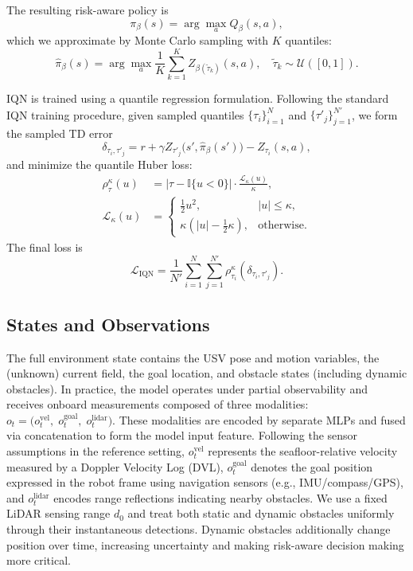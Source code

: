 \documentclass[runningheads]{llncs}
\begin{document}
The resulting risk-aware policy is
\begin{equation}
\pi_{\beta}(s)=\arg\max_{a} Q_{\beta}(s,a),
\label{eq:risk_policy}
\end{equation}
which we approximate by Monte Carlo sampling with $K$ quantiles:
\begin{equation}
\hat{\pi}_{\beta}(s)=
\arg\max_{a}\frac{1}{K}\sum_{k=1}^{K} Z_{\beta(\tilde{\tau}_k)}(s,a),
\quad
\tilde{\tau}_k \sim \mathcal{U}([0,1]).
\label{eq:risk_policy_mc}
\end{equation}

IQN is trained using a quantile regression formulation. Following the standard IQN training procedure, given sampled quantiles $\{\tau_i\}_{i=1}^{N}$ and $\{\tau'_j\}_{j=1}^{N'}$, we form the sampled TD error
\begin{equation}
\delta_{\tau_i,\tau'_j}
=
r + \gamma Z_{\tau'_j}\!\big(s', \hat{\pi}_{\beta}(s')\big)
- Z_{\tau_i}(s,a),
\label{eq:iqn_td}
\end{equation}
and minimize the quantile Huber loss:
\begin{align}
\rho^{\kappa}_{\tau}(u)
&=
|\tau-\mathbb{I}\{u<0\}|\cdot \frac{\mathcal{L}_{\kappa}(u)}{\kappa},
\label{eq:qhuber}\\
\mathcal{L}_{\kappa}(u)
&=
\begin{cases}
\frac{1}{2}u^{2}, & |u|\le\kappa,\\
\kappa(|u|-\frac{1}{2}\kappa), & \text{otherwise}.
\end{cases}
\nonumber
\end{align}
The final loss is
\begin{equation}
\mathcal{L}_{\mathrm{IQN}}
=
\frac{1}{N'}\sum_{i=1}^{N}\sum_{j=1}^{N'}
\rho^{\kappa}_{\tau_i}\!\left(\delta_{\tau_i,\tau'_j}\right).
\label{eq:iqn_loss}
\end{equation}

\subsection{States and Observations}
\label{sec:method_obs}
The full environment state contains the USV pose and motion variables, the (unknown) current field, the goal location, and obstacle states (including dynamic obstacles). In practice, the model operates under partial observability and receives onboard measurements composed of three modalities: $o_t=\big(o^{\mathrm{vel}}_t,\; o^{\mathrm{goal}}_t,\; o^{\mathrm{lidar}}_t\big)$.
These modalities are encoded by separate MLPs and fused via concatenation to form the model input feature.
Following the sensor assumptions in the reference setting, $o^{\mathrm{vel}}_t$ represents the seafloor-relative velocity measured by a Doppler Velocity Log (DVL), $o^{\mathrm{goal}}_t$ denotes the goal position expressed in the robot frame using navigation sensors (e.g., IMU/compass/GPS), and $o^{\mathrm{lidar}}_t$ encodes range reflections indicating nearby obstacles. We use a fixed LiDAR sensing range $d_0$ and treat both static and dynamic obstacles uniformly through their instantaneous detections. Dynamic obstacles additionally change position over time, increasing uncertainty and making risk-aware decision making more critical.
\end{document}
